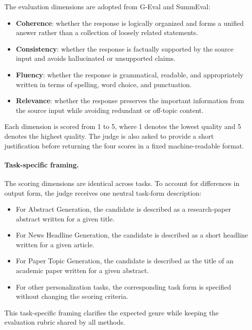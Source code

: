 \documentclass{article} %
\begin{document}
The evaluation dimensions are adopted from G-Eval and SummEval:

\begin{itemize}
    \item \textbf{Coherence}: whether the response is logically organized and forms a unified answer rather than a collection of loosely related statements.
    \item \textbf{Consistency}: whether the response is factually supported by the source input and avoids hallucinated or unsupported claims.
    \item \textbf{Fluency}: whether the response is grammatical, readable, and appropriately written in terms of spelling, word choice, and punctuation.
    \item \textbf{Relevance}: whether the response preserves the important information from the source input while avoiding redundant or off-topic content.
\end{itemize}

Each dimension is scored from 1 to 5, where 1 denotes the lowest quality and 5 denotes the highest quality. The judge is also asked to provide a short justification before returning the four scores in a fixed machine-readable format.

\paragraph{Task-specific framing.}
The scoring dimensions are identical across tasks. To account for differences in output form, the judge receives one neutral task-form description:

\begin{itemize}
    \item For Abstract Generation, the candidate is described as a research-paper abstract written for a given title.
    \item For News Headline Generation, the candidate is described as a short headline written for a given article.
    \item For Paper Topic Generation, the candidate is described as the title of an academic paper written for a given abstract.
    \item For other personalization tasks, the corresponding task form is specified without changing the scoring criteria.
\end{itemize}

This task-specific framing clarifies the expected genre while keeping the evaluation rubric shared by all methods.
\end{document}
